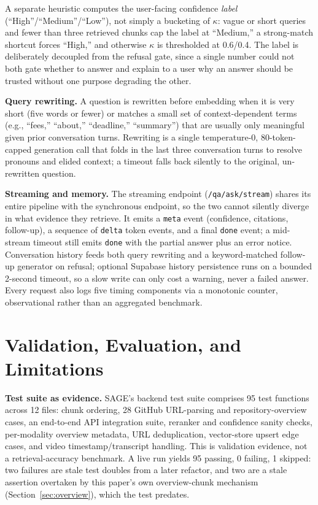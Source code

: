 \documentclass[conference]{IEEEtran}
\begin{document}
A separate heuristic computes the user-facing confidence \emph{label} (``High''/``Medium''/``Low''), not simply a bucketing of $\kappa$: vague or short queries and fewer than three retrieved chunks cap the label at ``Medium,'' a strong-match shortcut forces ``High,'' and otherwise $\kappa$ is thresholded at 0.6/0.4. The label is deliberately decoupled from the refusal gate, since a single number could not both gate whether to answer and explain to a user why an answer should be trusted without one purpose degrading the other.

\label{sec:interaction}
\textbf{Query rewriting.} A question is rewritten before embedding when it is very short (five words or fewer) or matches a small set of context-dependent terms (e.g., ``fees,'' ``about,'' ``deadline,'' ``summary'') that are usually only meaningful given prior conversation turns. Rewriting is a single temperature-0, 80-token-capped generation call that folds in the last three conversation turns to resolve pronouns and elided context; a timeout falls back silently to the original, un-rewritten question.

\textbf{Streaming and memory.} The streaming endpoint (\texttt{/qa/ask/stream}) shares its entire pipeline with the synchronous endpoint, so the two cannot silently diverge in what evidence they retrieve. It emits a \texttt{meta} event (confidence, citations, follow-up), a sequence of \texttt{delta} token events, and a final \texttt{done} event; a mid-stream timeout still emits \texttt{done} with the partial answer plus an error notice. Conversation history feeds both query rewriting and a keyword-matched follow-up generator on refusal; optional Supabase history persistence runs on a bounded 2-second timeout, so a slow write can only cost a warning, never a failed answer. Every request also logs five timing components via a monotonic counter, observational rather than an aggregated benchmark.

\section{Validation, Evaluation, and Limitations}
\label{sec:validation}

\textbf{Test suite as evidence.} SAGE's backend test suite comprises 95 test functions across 12 files: chunk ordering, 28 GitHub URL-parsing and repository-overview cases, an end-to-end API integration suite, reranker and confidence sanity checks, per-modality overview metadata, URL deduplication, vector-store upsert edge cases, and video timestamp/transcript handling. This is validation evidence, not a retrieval-accuracy benchmark. A live run yields 95 passing, 0 failing, 1 skipped: two failures are stale test doubles from a later refactor, and two are a stale assertion overtaken by this paper's own overview-chunk mechanism (Section~\ref{sec:overview}), which the test predates.
\end{document}
